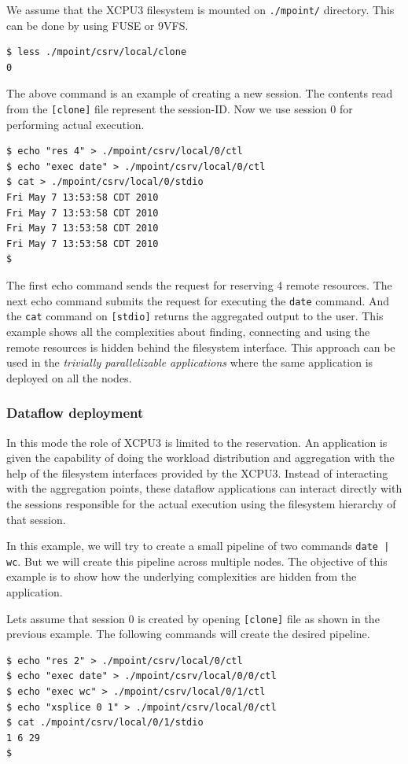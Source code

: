 \documentclass[conference]{IEEEtran}
\begin{document}
We assume that the XCPU3 filesystem is mounted on \texttt{./mpoint/} directory. 
This can be done by using FUSE or 9VFS\cite{v9fseric}.
\begin{verbatim}
$ less ./mpoint/csrv/local/clone
0 
\end{verbatim}
The above command is an example of creating a new session. The contents read
from the \texttt{[clone]} file represent the session-ID.  Now we use session 0
for performing actual execution.
\begin{verbatim}
$ echo "res 4" > ./mpoint/csrv/local/0/ctl
$ echo "exec date" > ./mpoint/csrv/local/0/ctl
$ cat > ./mpoint/csrv/local/0/stdio
Fri May 7 13:53:58 CDT 2010
Fri May 7 13:53:58 CDT 2010
Fri May 7 13:53:58 CDT 2010
Fri May 7 13:53:58 CDT 2010
$
\end{verbatim}
The first echo command sends the request for reserving 4 remote resources. The
next echo command submits the request for executing the \texttt{date} command.
And the \texttt{cat} command on \texttt{[stdio]} returns the aggregated output
to the user.  This example shows all the complexities about finding, connecting
and using the remote resources is hidden behind the filesystem interface.
This approach can be used in the \textit{trivially parallelizable applications}
where the same application is deployed on all the nodes.

\subsubsection{Dataflow deployment}
In this mode the role of XCPU3 is limited to the reservation. An application
is given the capability of doing the workload distribution and aggregation
with the help of the filesystem interfaces provided by the XCPU3. Instead of
interacting with the aggregation points, these dataflow applications can
interact directly with the sessions responsible for the actual execution using
the filesystem hierarchy of that session.

In this example, we will try to create a small pipeline of two commands
\texttt{date | wc}.  But we will create this pipeline across multiple nodes. 
The objective of this example is to show how the underlying complexities are
hidden from the application.

Lets assume that session 0 is created by opening \texttt{[clone]} file as shown
in the previous example.  The following commands will create the desired
pipeline.

\begin{verbatim}
$ echo "res 2" > ./mpoint/csrv/local/0/ctl
$ echo "exec date" > ./mpoint/csrv/local/0/0/ctl
$ echo "exec wc" > ./mpoint/csrv/local/0/1/ctl
$ echo "xsplice 0 1" > ./mpoint/csrv/local/0/ctl
$ cat ./mpoint/csrv/local/0/1/stdio
1 6 29
$
\end{verbatim}
\end{document}
